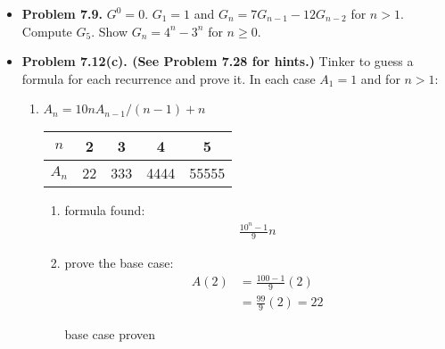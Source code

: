 \documentclass{article}
\begin{document}
    \begin{itemize}
        \item \textbf{Problem 7.9.} $G^0 = 0$. $G_1 = 1$ and $G_n = 7G_{n-1} - 12 G_{n-2}$ for $n > 1$. Compute $G_5$. Show $G_n = 4^n - 3^n$ for $n \geq 0$.
        \item \textbf{Problem 7.12(c). (See Problem 7.28 for hints.)} Tinker to guess a formula for each recurrence and prove it. In each case $A_1 = 1$ and for $n > 1$:
        \begin{enumerate}[label=(c)]
            \item $A_n = 10nA_{n-1} / (n-1) + n$
            \newline
            \begin{tabular}{ |c|c|c|c|c| } 
                \hline
                $n$ & 2 & 3 & 4 & 5\\ 
                \hline
                $A_n$ & 22 & 333 & 4444 & 55555 \\
                \hline
            \end{tabular}
            \begin{enumerate}[label=\roman*.]
                \item formula found:
                \begin{align*}
                    \frac{10^n-1}{9}n
                \end{align*}
                \item prove the base case:
                \begin{align*}
                    A(2) &= \frac{100-1}{9}(2)\\
                         &= \frac{99}{9}(2) = 22
                \end{align*}
                \begin{center}
                    base case proven
                \end{center}


\end{enumerate}
\end{enumerate}
\end{itemize}
\end{document}
